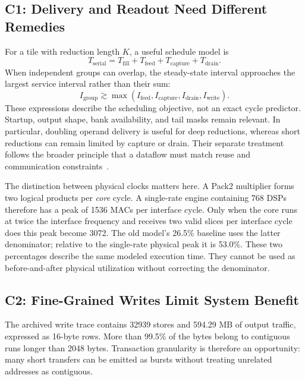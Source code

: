 \documentclass[10pt,conference,letterpaper]{IEEEtran}
\begin{document}
\subsection{C1: Delivery and Readout Need Different Remedies}
For a tile with reduction length $K$, a useful schedule model is
\begin{equation}
T_{\mathrm{serial}}=T_{\mathrm{fill}}+T_{\mathrm{feed}}+T_{\mathrm{capture}}+T_{\mathrm{drain}}.
\end{equation}
When independent groups can overlap, the steady-state interval approaches the largest service interval rather than their sum:
\begin{equation}
I_{\mathrm{group}}\gtrsim\max(I_{\mathrm{feed}},I_{\mathrm{capture}},I_{\mathrm{drain}},I_{\mathrm{write}}).
\label{eq:interval}
\end{equation}
These expressions describe the scheduling objective, not an exact cycle predictor. Startup, output shape, bank availability, and tail masks remain relevant. In particular, doubling operand delivery is useful for deep reductions, whereas short reductions can remain limited by capture or drain. Their separate treatment follows the broader principle that a dataflow must match reuse and communication constraints~\cite{eyeriss,maestro}.

The distinction between physical clocks matters here. A Pack2 multiplier forms two logical products per \emph{core} cycle. A single-rate engine containing 768 DSPs therefore has a peak of 1536 MACs per interface cycle. Only when the core runs at twice the interface frequency and receives two valid slices per interface cycle does this peak become 3072. The old model's 26.5\% baseline uses the latter denominator; relative to the single-rate physical peak it is 53.0\%. These two percentages describe the same modeled execution time. They cannot be used as before-and-after physical utilization without correcting the denominator.

\subsection{C2: Fine-Grained Writes Limit System Benefit}
The archived write trace contains 32939 stores and 594.29 MB of output traffic, expressed as 16-byte rows. More than 99.5\% of the bytes belong to contiguous runs longer than 2048 bytes. Transaction granularity is therefore an opportunity: many short transfers can be emitted as bursts without treating unrelated addresses as contiguous.
\end{document}

